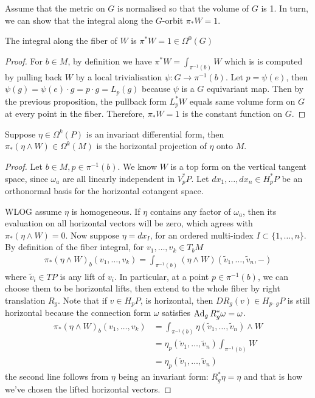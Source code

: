 Assume that the metric on $G$ is normalised so that the volume of $G$ is 1.
In turn, we can show that the integral along the $G$-orbit $\pi_*W = 1$. 
\begin{cor}
	The integral along the fiber of $W$ is  $\pi^*W = 1 \in \Omega^0(G)$
\end{cor}
\begin{proof}
	For $b\in M$, by definition we have $\pi^*W = \int_{\pi^{-1}(b)} W$ which is
	is computed by pulling back $W$ by a 
	local trivialisation $\psi : G \to \pi^{-1}(b)$. 
	Let $p=\psi(e)$, then $\psi(g) = \psi(e)\cdot g = p\cdot g = L_p(g)$ because
	$\psi$ is a  $G$ equivariant map. Then by the previous proposition, the
	pullback form $L_p^*W$ equals same volume form on $G$ at every point in the 
	fiber. Therefore, $\pi_*W = 1$ is the constant function on  $G$.
\end{proof}

\begin{prop} \label{prop:integral_horizontal_proj}
	Suppose $\eta \in \Omega^k(P)$ is an invariant differential form, then
	 $\pi_*(\eta \wedge W) \in \Omega^k(M)$ is the horizontal projection of 
	 $\eta$ onto $M$.
\end{prop}
\begin{proof}
	Let $b\in M, p\in \pi^{-1}(b)$. 
	We know  $W$ is a top form on the vertical tangent space, 
	since  $\omega_a$ are all linearly independent in $V_p^*P$. Let
	$dx_1,\ldots,dx_n \in H_p^*P$ be an orthonormal basis for the horizontal
	cotangent space. 

	WLOG assume $\eta$ is homogeneous. If $\eta$ contains any factor of
	$\omega_a$, then its evaluation on all horizontal vectors will be zero, which
	agrees with $\pi_*(\eta\wedge W) = 0$. Now suppose $\eta = dx_I$, for 
	an ordered multi-index $I\subset\{1,\ldots,n\}$.
	By definition of the fiber integral, for $v_1,\ldots,v_k \in T_bM$
	\begin{align*}
		\pi_*(\eta\wedge W)_b(v_1,\ldots,v_k) 
		= \int_{\pi^{-1}(b)} (\eta\wedge W)(\widetilde{v}_1,\ldots,\widetilde{v}_n,-)
	\end{align*}
	where $\widetilde{v}_i \in TP$ is any lift of $v_i$. In particular, at a
	point $p\in \pi^{-1}(b)$, we can choose them to be horizontal lifts, then
	extend to the whole fiber by right translation $R_g$. Note that if  $v\in H_pP$, is
	horizontal, then  $DR_g(v) \in H_{p\cdot g}P$ is still horizontal because 
	the connection form $\omega$ satisfies  $\operatorname{Ad}_g R_g^* \omega = \omega$. 
	\begin{align*}
		\pi_*(\eta\wedge W)_b(v_1,\ldots,v_k) 
		&= \int_{\pi^{-1}(b)} \eta(\widetilde{v}_1,\ldots,\widetilde{v}_n)\wedge W \\
		&= \eta_p(\widetilde{v}_1,\ldots,\widetilde{v}_n)\int_{\pi^{-1}(b)} W \\
		&= \eta_p(\widetilde{v}_1,\ldots,\widetilde{v}_n) 
	\end{align*}
	the second line follows from $\eta$ being an invariant form: 
	$R_g^*\eta = \eta$ and that is how we've chosen the lifted horizontal
	vectors. 
\end{proof}


